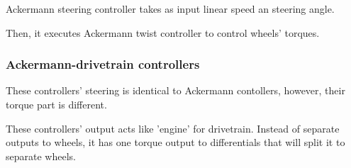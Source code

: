 \documentclass[a4paper,11pt]{article}
\begin{document}
Ackermann steering controller takes as input linear speed an steering angle. 

Then, it executes Ackermann twist controller to control wheels' torques. 

\subsubsection{Ackermann-drivetrain controllers}

These controllers' steering is identical to Ackermann contollers, however, their torque part is different. 

These controllers' output acts like 'engine' for drivetrain. Instead of separate outputs to wheels, it has one torque output to differentials that will split it to separate wheels. 

\nocite{*}


\end{document}

